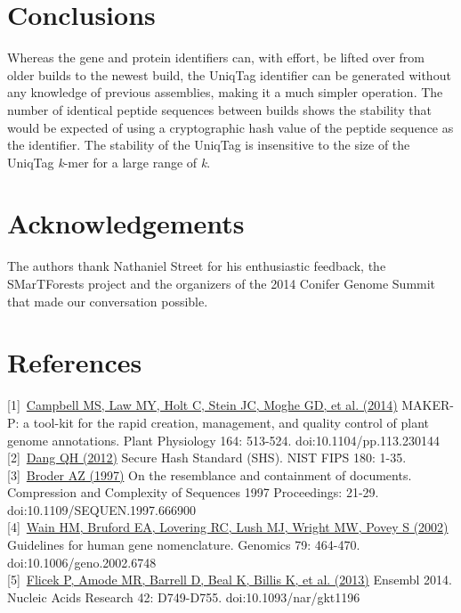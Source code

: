 \documentclass[10pt]{article}
\begin{document}
\section{Conclusions}\label{conclusions}

Whereas the gene and protein identifiers can, with effort, be lifted
over from older builds to the newest build, the UniqTag identifier can
be generated without any knowledge of previous assemblies, making it a
much simpler operation. The number of identical peptide sequences
between builds shows the stability that would be expected of using a
cryptographic hash value of the peptide sequence as the identifier. The
stability of the UniqTag is insensitive to the size of the UniqTag
\emph{k}-mer for a large range of \emph{k}.

\section{Acknowledgements}\label{acknowledgements}

The authors thank Nathaniel Street for his enthusiastic feedback, the
SMarTForests project and the organizers of the 2014 Conifer Genome
Summit that made our conversation possible.

\section{References}\label{references}

{[}1{]}~\href{http://dx.doi.org/10.1104/pp.113.230144}{Campbell MS, Law
MY, Holt C, Stein JC, Moghe GD, et al. (2014)} MAKER-P: a tool-kit for
the rapid creation, management, and quality control of plant genome
annotations. Plant Physiology 164: 513-524.
doi:10.1104/pp.113.230144\\{[}2{]}~\href{http://www.nist.gov/manuscript-publication-search.cfm?pub_id=910977}{Dang
QH (2012)} Secure Hash Standard (SHS). NIST FIPS 180:
1-35.\\{[}3{]}~\href{http://dx.doi.org/10.1109/SEQUEN.1997.666900}{Broder
AZ (1997)} On the resemblance and containment of documents. Compression
and Complexity of Sequences 1997 Proceedings: 21-29.
doi:10.1109/SEQUEN.1997.666900\\{[}4{]}~\href{http://dx.doi.org/10.1006/geno.2002.6748}{Wain
HM, Bruford EA, Lovering RC, Lush MJ, Wright MW, Povey S (2002)}
Guidelines for human gene nomenclature. Genomics 79: 464-470.
doi:10.1006/geno.2002.6748\\{[}5{]}~\href{http://dx.doi.org/10.1093/nar/gkt1196}{Flicek
P, Amode MR, Barrell D, Beal K, Billis K, et al. (2013)} Ensembl 2014.
Nucleic Acids Research 42: D749-D755. doi:10.1093/nar/gkt1196
\end{document}

